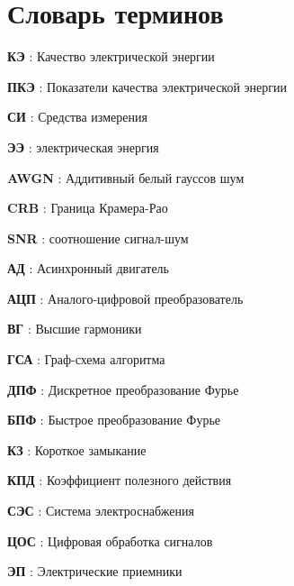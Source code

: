 \chapter*{Словарь терминов}             %

\textbf{КЭ} : Качество электрической энергии

\textbf{ПКЭ} : Показатели качества электрической энергии

\textbf{СИ} : Средства измерения

\textbf{ЭЭ} : электрическая энергия

\textbf{AWGN} : Аддитивный белый гауссов шум

\textbf{CRB} : Граница Крамера-Рао

\textbf{SNR} : соотношение сигнал-шум

\textbf{АД} : Асинхронный двигатель

\textbf{АЦП} : Аналого-цифровой преобразователь

\textbf{ВГ} : Высшие гармоники

\textbf{ГСА} : Граф-схема алгоритма 

\textbf{ДПФ} : Дискретное преобразование Фурье

\textbf{БПФ} : Быстрое преобразование Фурье

\textbf{КЗ} : Короткое замыкание

\textbf{КПД} : Коэффициент полезного действия

\textbf{СЭС} : Система электроснабжения

\textbf{ЦОС} : Цифровая обработка сигналов

\textbf{ЭП} : Электрические приемники


